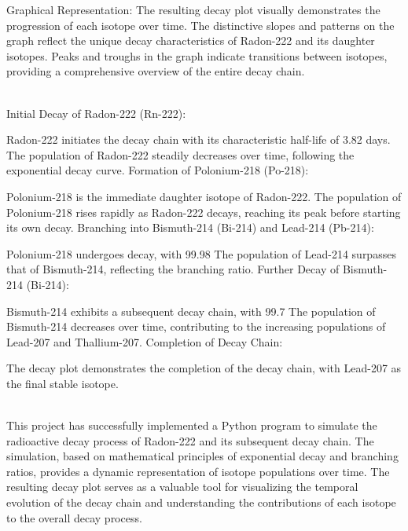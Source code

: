 \documentclass[12pt]{article}
\begin{document}
Graphical Representation:
The resulting decay plot visually demonstrates the progression of each isotope over time. The distinctive slopes and patterns on the graph reflect the unique decay characteristics of Radon-222 and its daughter isotopes. Peaks and troughs in the graph indicate transitions between isotopes, providing a comprehensive overview of the entire decay chain.

\vskip0.1in
\\

Initial Decay of Radon-222 (Rn-222):

Radon-222 initiates the decay chain with its characteristic half-life of 3.82 days.
The population of Radon-222 steadily decreases over time, following the exponential decay curve.
Formation of Polonium-218 (Po-218):

Polonium-218 is the immediate daughter isotope of Radon-222.
The population of Polonium-218 rises rapidly as Radon-222 decays, reaching its peak before starting its own decay.
Branching into Bismuth-214 (Bi-214) and Lead-214 (Pb-214):

Polonium-218 undergoes decay, with 99.98%
The population of Lead-214 surpasses that of Bismuth-214, reflecting the branching ratio.
Further Decay of Bismuth-214 (Bi-214):

Bismuth-214 exhibits a subsequent decay chain, with 99.7%
The population of Bismuth-214 decreases over time, contributing to the increasing populations of Lead-207 and Thallium-207.
Completion of Decay Chain:

The decay plot demonstrates the completion of the decay chain, with Lead-207 as the final stable isotope.











\vskip0.1in
\\

This project has successfully implemented a Python program to simulate the radioactive decay process of Radon-222 and its subsequent decay chain. The simulation, based on mathematical principles of exponential decay and branching ratios, provides a dynamic representation of isotope populations over time. The resulting decay plot serves as a valuable tool for visualizing the temporal evolution of the decay chain and understanding the contributions of each isotope to the overall decay process.
\end{document}
